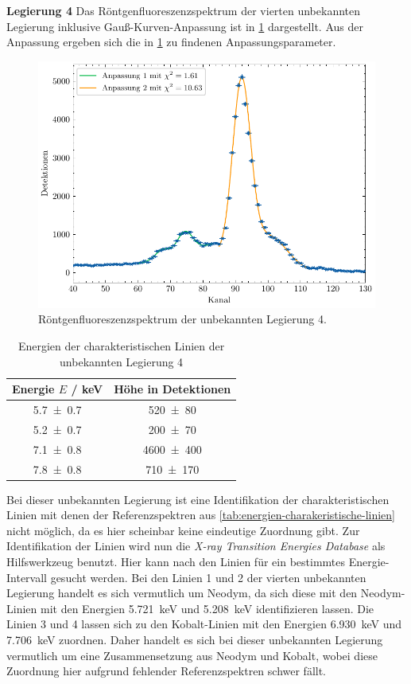 \noindent\textbf{Legierung 4}\newline
Das Röntgenfluoreszenzspektrum der vierten unbekannten Legierung inklusive Gauß-Kurven-Anpassung ist in \cref{fig:unbekannt4} dargestellt. Aus der Anpassung ergeben sich die
in \cref{tab:unbekannt4} zu findenen Anpassungsparameter.
\begin{figure}[H]
	\centering
	\includegraphics[width=0.6\linewidth]{../figs/Unbekannt4.pdf}
	\caption{Röntgenfluoreszenzspektrum der unbekannten Legierung 4.}
	\label{fig:unbekannt4}
\end{figure}
\begin{table}[H]
    \centering
    \caption{Energien der charakteristischen Linien der unbekannten Legierung 4}
    \label{tab:unbekannt4}
    \begin{tabular}{c|c}
       Energie $E$ / \unit{\kilo\electronvolt} & Höhe in Detektionen \\
\hline
\num{5.7\pm 0.7} & \num{520\pm 80} \\ 
\num{5.2\pm 0.7} & \num{200\pm 70} \\ 
\num{7.1\pm 0.8} & \num{4600\pm 400} \\ 
\num{7.8\pm 0.8} & \num{710\pm 170} \\ 

    \end{tabular}
\end{table} Bei dieser unbekannten Legierung ist eine Identifikation der charakteristischen Linien mit denen der Referenzspektren aus \cref{tab:energien-charakeristische-linien}
nicht möglich, da es hier scheinbar keine eindeutige Zuordnung gibt. Zur Identifikation der Linien wird nun die \textit{X-ray Transition Energies Database} \cite{nist_search}
als Hilfswerkzeug benutzt. Hier kann nach den Linien für ein bestimmtes Energie-Intervall gesucht werden. Bei den Linien 1 und 2 der vierten unbekannten Legierung
handelt es sich vermutlich um Neodym, da sich diese mit den Neodym-Linien mit den Energien \SI{5,721}{\kilo \electronvolt} und \SI{5,208}{\kilo \electronvolt}
identifizieren lassen. Die Linien 3 und 4 lassen sich zu den Kobalt-Linien mit den Energien \SI{6,930}{\kilo \electronvolt} und \SI{7,706}{\kilo \electronvolt}
zuordnen. Daher handelt es sich bei dieser unbekannten Legierung vermutlich um eine Zusammensetzung aus Neodym und Kobalt, wobei diese Zuordnung hier
aufgrund fehlender Referenzspektren schwer fällt.
